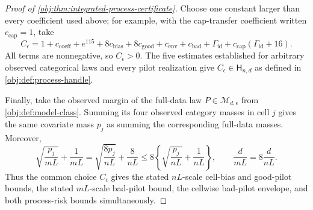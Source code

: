 \begin{proof}[Proof of \cref{obj:thm:integrated-process-certificate}]
Choose one constant larger than every coefficient used above; for example, with the cap-transfer coefficient written \(c_{\mathrm{cap}}=1\), take
\[
C_\epsilon
 =1+c_{\mathrm{coeff}}+e^{115}
   +8c_{\mathrm{bias}}+8c_{\mathrm{good}}
   +c_{\mathrm{env}}+c_{\mathrm{bad}}
   +\Gamma_{\mathrm{id}}
   +c_{\mathrm{cap}}(\Gamma_{\mathrm{id}}+16).
\]
All terms are nonnegative, so \(C_\epsilon>0\). The five estimates established for arbitrary observed categorical laws and every pilot realization give \(C_\epsilon\in\mathsf H_{n,d}\) as defined in \cref{obj:def:process-handle}.

Finally, take the observed margin of the full-data law \(P\in\mathcal M_{d,\epsilon}\) from \cref{obj:def:model-class}. Summing its four observed category masses in cell \(j\) gives the same covariate mass \(p_j\) as summing the corresponding full-data masses. Moreover,
\[
\sqrt{\frac{p_j}{mL}}+\frac1{mL}
 =\sqrt{\frac{8p_j}{nL}}+\frac8{nL}
 \leq8\left\{\sqrt{\frac{p_j}{nL}}+\frac1{nL}\right\},
\qquad
\frac d{mL}=8\frac d{nL}.
\]
Thus the common choice \(C_\epsilon\) gives the stated \(nL\)-scale cell-bias and good-pilot bounds, the stated \(mL\)-scale bad-pilot bound, the cellwise bad-pilot envelope, and both process-risk bounds simultaneously. %
\end{proof}

